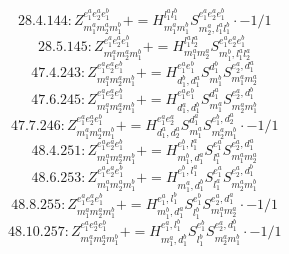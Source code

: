 \documentclass[letterpaper,10pt,fleqn,leqno,onecolumn]{article}
\begin{document}
\begin{equation} \;\;\;\;\;\;  28.4.144: Z^{e_{1}^{a}e_{2}^{a}e_{1}^{b}}_{m_{1}^{a}m_{2}^{a}m_{1}^{b}}+=H^{l_{1}^{a}l_{1}^{b}}_{m_{1}^{a}m_{1}^{b}}S^{e_{1}^{a}e_{2}^{a}e_{1}^{b}}_{m_{2}^{a},l_{1}^{a}l_{1}^{b}}\cdot -1/1 \end{equation}
\begin{equation} \;\;\;\;\;\;  28.5.145: Z^{e_{1}^{a}e_{2}^{a}e_{1}^{b}}_{m_{1}^{a}m_{2}^{a}m_{1}^{b}}+=H^{l_{1}^{a}l_{2}^{a}}_{m_{1}^{a}m_{2}^{a}}S^{e_{1}^{a}e_{2}^{a}e_{1}^{b}}_{m_{1}^{b},l_{1}^{a}l_{2}^{a}} \end{equation}
\begin{equation} \;\;\;\;\;\;  47.4.243: Z^{e_{1}^{a}e_{2}^{a}e_{1}^{b}}_{m_{1}^{a}m_{2}^{a}m_{1}^{b}}+=H^{e_{1}^{a}e_{1}^{b}}_{d_{1}^{b},d_{1}^{a}}S^{d_{1}^{b}}_{m_{1}^{b}}S^{e_{2}^{a},d_{1}^{a}}_{m_{1}^{a}m_{2}^{a}} \end{equation}
\begin{equation} \;\;\;\;\;\;  47.6.245: Z^{e_{1}^{a}e_{2}^{a}e_{1}^{b}}_{m_{1}^{a}m_{2}^{a}m_{1}^{b}}+=H^{e_{1}^{a}e_{1}^{b}}_{d_{1}^{a},d_{1}^{b}}S^{d_{1}^{a}}_{m_{1}^{a}}S^{e_{2}^{a},d_{1}^{b}}_{m_{2}^{a}m_{1}^{b}} \end{equation}
\begin{equation} \;\;\;\;\;\;  47.7.246: Z^{e_{1}^{a}e_{2}^{a}e_{1}^{b}}_{m_{1}^{a}m_{2}^{a}m_{1}^{b}}+=H^{e_{1}^{a}e_{2}^{a}}_{d_{1}^{a},d_{2}^{a}}S^{d_{1}^{a}}_{m_{1}^{a}}S^{e_{1}^{b},d_{2}^{a}}_{m_{2}^{a}m_{1}^{b}}\cdot -1/1 \end{equation}
\begin{equation} \;\;\;\;\;\;  48.4.251: Z^{e_{1}^{a}e_{2}^{a}e_{1}^{b}}_{m_{1}^{a}m_{2}^{a}m_{1}^{b}}+=H^{e_{1}^{b},l_{1}^{a}}_{m_{1}^{b},d_{1}^{a}}S^{e_{1}^{a}}_{l_{1}^{a}}S^{e_{2}^{a},d_{1}^{a}}_{m_{1}^{a}m_{2}^{a}} \end{equation}
\begin{equation} \;\;\;\;\;\;  48.6.253: Z^{e_{1}^{a}e_{2}^{a}e_{1}^{b}}_{m_{1}^{a}m_{2}^{a}m_{1}^{b}}+=H^{e_{1}^{b},l_{1}^{a}}_{m_{1}^{a},d_{1}^{b}}S^{e_{1}^{a}}_{l_{1}^{a}}S^{e_{2}^{a},d_{1}^{b}}_{m_{2}^{a}m_{1}^{b}} \end{equation}
\begin{equation} \;\;\;\;\;\;  48.8.255: Z^{e_{1}^{a}e_{2}^{a}e_{1}^{b}}_{m_{1}^{a}m_{2}^{a}m_{1}^{b}}+=H^{e_{1}^{a},l_{1}^{b}}_{m_{1}^{b},d_{1}^{a}}S^{e_{1}^{b}}_{l_{1}^{b}}S^{e_{2}^{a},d_{1}^{a}}_{m_{1}^{a}m_{2}^{a}}\cdot -1/1 \end{equation}
\begin{equation} \;\;\;\;\;\;  48.10.257: Z^{e_{1}^{a}e_{2}^{a}e_{1}^{b}}_{m_{1}^{a}m_{2}^{a}m_{1}^{b}}+=H^{e_{1}^{a},l_{1}^{b}}_{m_{1}^{a},d_{1}^{b}}S^{e_{1}^{b}}_{l_{1}^{b}}S^{e_{2}^{a},d_{1}^{b}}_{m_{2}^{a}m_{1}^{b}}\cdot -1/1 \end{equation}
\end{document}
